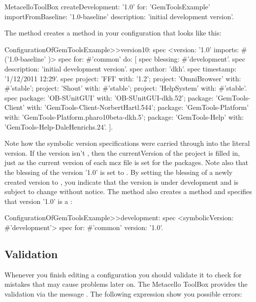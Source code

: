 \documentclass[a4paper,10pt,twoside]{book}
\begin{document}
\begin{code}{}
  MetacelloToolBox
    createDevelopment: '1.0'
    for: 'GemToolsExample'
    importFromBaseline: '1.0-baseline'
    description: 'initial development version'.
\end{code}

The  method creates a  method in your configuration that looks like this:

\begin{code}{}
ConfigurationOfGemToolsExample>>version10: spec
  <version: '1.0' imports: #('1.0-baseline' )>
  spec for: #'common' do: [
    spec blessing: #'development'.
    spec description: 'initial development version'.
    spec author: 'dkh'.
    spec timestamp: '1/12/2011 12:29'.
    spec 
      project: 'FFI' with: '1.2';
      project: 'OmniBrowser' with: #'stable';
      project: 'Shout' with: #'stable';
      project: 'HelpSystem' with: #'stable'.
    spec
      package: 'OB-SUnitGUI' with: 'OB-SUnitGUI-dkh.52';
      package: 'GemTools-Client' with: 'GemTools-Client-NorbertHartl.544';
      package: 'GemTools-Platform' with: 'GemTools-Platform.pharo10beta-dkh.5';
      package: 'GemTools-Help' with: 'GemTools-Help-DaleHenrichs.24'. ].
\end{code}

Note how the  symbolic version specifications were carried through into the literal version. If the version isn't , then the currentVersion of the project is filled in, just as the current version of each mcz file is set for the packages. Note also that the blessing of the version '1.0' is set to . By setting the blessing of a newly created version to , you indicate that the version is under development and is subject to change without notice. The  method also creates a  method and specifies that version '1.0' is a :

\begin{code}{}
ConfigurationOfGemToolsExample>>development: spec
  <symbolicVersion: #'development'>
  spec for: #'common' version: '1.0'.
\end{code}


\subsection{Validation}

Whenever you finish editing a configuration you should validate it to check for mistakes that may cause problems later on. The Metacello ToolBox provides the validation via the message . The following expression show you possible errors: 
\end{document}
